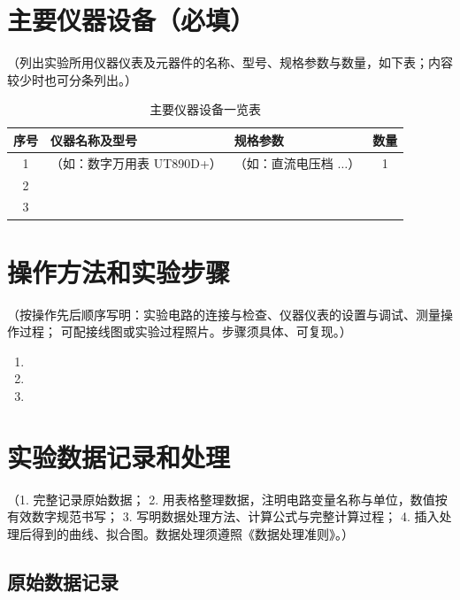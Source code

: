 \documentclass[UTF8,AutoFakeBold]{article}%
\begin{document}
\section{主要仪器设备（必填）}
（列出实验所用仪器仪表及元器件的名称、型号、规格参数与数量，如下表；内容较少时也可分条列出。）

\begin{table}[H]
  \centering
  \caption{主要仪器设备一览表}
  \label{tab:instruments}
  \renewcommand{\arraystretch}{1.25}
  \begin{tabular}{c l l c}
    \toprule
    序号 & 仪器名称及型号 & 规格参数 & 数量 \\
    \midrule
    1 & （如：数字万用表 UT890D+） & （如：直流电压档 $\dots$） & 1 \\
    2 &  &  &  \\
    3 &  &  &  \\
    \bottomrule
  \end{tabular}
\end{table}

\section{操作方法和实验步骤}
（按操作先后顺序写明：实验电路的连接与检查、仪器仪表的设置与调试、测量操作过程；
可配接线图或实验过程照片。步骤须具体、可复现。）

\begin{enumerate}[label=（\arabic*）]
  \item 
  \item 
  \item 
\end{enumerate}

\section{实验数据记录和处理}
（1. 完整记录原始数据；
2. 用表格整理数据，注明电路变量名称与单位，数值按有效数字规范书写；
3. 写明数据处理方法、计算公式与完整计算过程；
4. 插入处理后得到的曲线、拟合图。数据处理须遵照《数据处理准则》。）

\subsection{原始数据记录}
\end{document}

